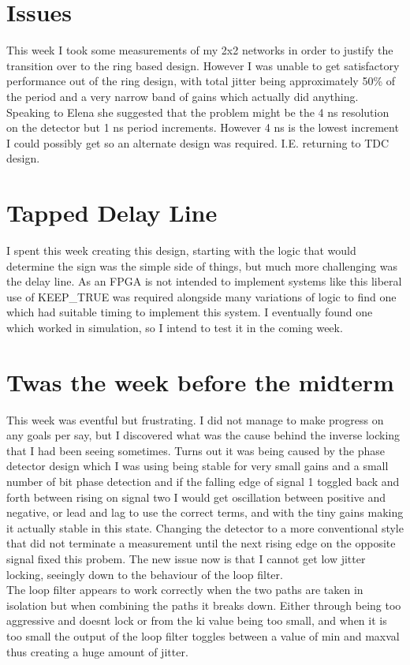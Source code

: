 \documentclass[a4paper,12pt]{report}
\begin{document}
\section*{Issues}
This week I took some measurements of my 2x2 networks in order to justify the transition over to the ring based design. However I was unable to get satisfactory performance out of the ring design, with total jitter being approximately 50\% of the period and a very narrow band of gains which actually did anything.
Speaking to Elena she suggested that the problem might be the 4 ns resolution on the detector but 1 ns period increments. However 4 ns is the lowest increment I could possibly get so an alternate design was required. I.E. returning to TDC design.

\section*{Tapped Delay Line}
I spent this week creating this design, starting with the logic that would determine the sign was the simple side of things, but much more challenging was the delay line. As an FPGA is not intended to implement systems like this liberal use of KEEP\_TRUE was required alongside many variations of logic to find one which had suitable timing to implement this system. I eventually found one which worked in simulation, so I intend to test it in the coming week.

\section*{Twas the week before the midterm}
This week was eventful but frustrating. I did not manage to make progress on any goals per say, but I discovered what was the cause behind the inverse locking that I had been seeing sometimes. Turns out it was being caused by the phase detector design which I was using being stable for very small gains and a small number of bit phase detection and if the falling edge of signal 1 toggled back and forth between rising on signal two I would get oscillation between positive and negative, or lead and lag to use the correct terms, and with the tiny gains making it actually stable in this state. Changing the detector to a more conventional style that did not terminate a measurement until the next rising edge on the opposite signal fixed this probem. The new issue now is that I cannot get low jitter locking, seeingly down to the behaviour of the loop filter.\\
The loop filter appears to work correctly when the two paths are taken in isolation but when combining the paths it breaks down. Either through being too aggressive and doesnt lock or from the ki value being too small, and when it is too small the output of the loop filter toggles between a value of min and maxval thus creating a huge amount of jitter.
\end{document}
